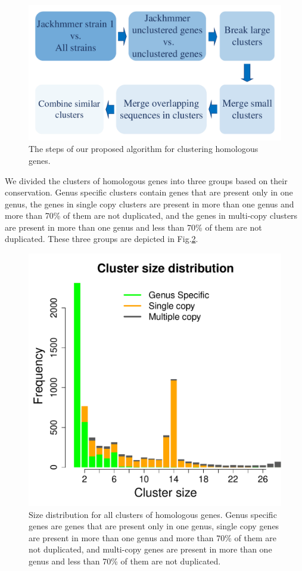 \documentclass[12pt,letterpaper]{article}
\begin{document}
\begin{figure}
\includegraphics[scale=0.2]{homclust.pdf}
\caption{The steps of our proposed algorithm for clustering homologous genes.}
\label{fig:homclust}
\end{figure}

We divided the clusters of homologous genes into three groups based on their conservation. Genus specific clusters contain genes that are present only in one genus, the genes in single copy clusters are present in more than one genus and more than 70\% of them are not duplicated, and  the genes in multi-copy clusters are present in more than one genus and less than 70\% of them are not duplicated. These three groups are depicted in Fig.\@ \ref{fig:homclust-results}.

\begin{figure}
\includegraphics[scale=0.3]{cluster-size-dist.pdf}
\caption{Size distribution for all clusters of homologous genes. Genus specific genes are genes that are present only in one genus, single copy genes are present in more than one genus and more than 70\% of them are not duplicated, and multi-copy genes are present in more than one genus and less than 70\% of them are not duplicated.}
\label{fig:homclust-results}
\end{figure}
\end{document}
